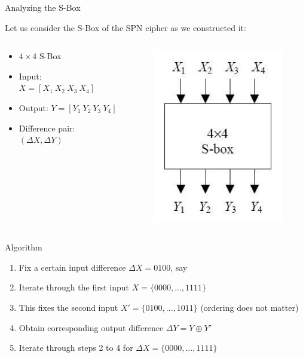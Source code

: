 \documentclass[9pt]{beamer}
\begin{document}
\begin{frame}
Analyzing the S-Box

Let us consider the S-Box of the SPN cipher as we constructed it:
\begin{columns}
\begin{column}{0.5\textwidth}
\begin{itemize}
\item{$4 \times 4$ S-Box}
\item{Input: $X = [X_1 \: X_2 \: X_3 \: X_4]$}
\item{Output: $Y = [Y_1 \: Y_2 \: Y_3 \: Y_4]$}
\item{Difference pair: $(\Delta X, \Delta Y)$}
\end{itemize}
\end{column}
\begin{column}{0.5\textwidth}
\begin{figure}
\includegraphics[totalheight=0.3\textheight]{spn_sbox_unkeyed.jpg}
\end{figure}\end{column}
\end{columns}

Algorithm
\begin{enumerate}
\item{Fix a certain input difference $\Delta X = 0100$, say}
\item{Iterate through the first input $X = \{0000, ... ,1111 \}$}
\item{This fixes the second input $X' = \{0100, ... ,1011\}$ (ordering does not matter)}
\item{Obtain corresponding output difference $\Delta Y = Y \oplus Y'$}
\item{Iterate through steps 2 to 4 for $\Delta X = \{0000, ... ,1111 \}$} 
\end{enumerate}
\end{frame}
\end{document}
